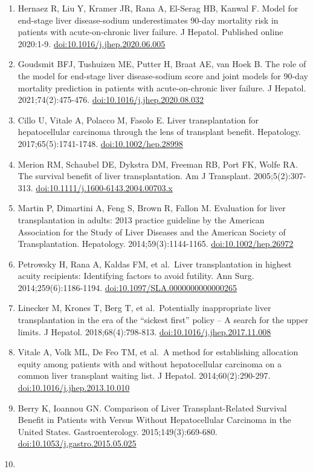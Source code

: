 \documentclass[11pt,english,]{book} %
\begin{document}
\begin{enumerate}
\item
  Hernaez R, Liu Y, Kramer JR, Rana A, El-Serag HB, Kanwal F. Model for end-stage liver disease-sodium underestimates 90-day mortality risk in patients with acute-on-chronic liver failure. J Hepatol. Published online 2020:1-9. \url{doi:10.1016/j.jhep.2020.06.005}
\item
  Goudsmit BFJ, Tushuizen ME, Putter H, Braat AE, van Hoek B. The role of the model for end-stage liver disease-sodium score and joint models for 90-day mortality prediction in patients with acute-on-chronic liver failure. J Hepatol. 2021;74(2):475-476. \url{doi:10.1016/j.jhep.2020.08.032}
\item
  Cillo U, Vitale A, Polacco M, Fasolo E. Liver transplantation for hepatocellular carcinoma through the lens of transplant benefit. Hepatology. 2017;65(5):1741-1748. \url{doi:10.1002/hep.28998}
\item
  Merion RM, Schaubel DE, Dykstra DM, Freeman RB, Port FK, Wolfe RA. The survival benefit of liver transplantation. Am J Transplant. 2005;5(2):307-313. \url{doi:10.1111/j.1600-6143.2004.00703.x}
\item
  Martin P, Dimartini A, Feng S, Brown R, Fallon M. Evaluation for liver transplantation in adults: 2013 practice guideline by the American Association for the Study of Liver Diseases and the American Society of Transplantation. Hepatology. 2014;59(3):1144-1165. \url{doi:10.1002/hep.26972}
\item
  Petrowsky H, Rana A, Kaldas FM, et al.~Liver transplantation in highest acuity recipients: Identifying factors to avoid futility. Ann Surg. 2014;259(6):1186-1194. \url{doi:10.1097/SLA.0000000000000265}
\item
  Linecker M, Krones T, Berg T, et al.~Potentially inappropriate liver transplantation in the era of the ``sickest first'' policy -- A search for the upper limits. J Hepatol. 2018;68(4):798-813. \url{doi:10.1016/j.jhep.2017.11.008}
\item
  Vitale A, Volk ML, De Feo TM, et al.~A method for establishing allocation equity among patients with and without hepatocellular carcinoma on a common liver transplant waiting list. J Hepatol. 2014;60(2):290-297. \url{doi:10.1016/j.jhep.2013.10.010}
\item
  Berry K, Ioannou GN. Comparison of Liver Transplant-Related Survival Benefit in Patients with Versus Without Hepatocellular Carcinoma in the United States. Gastroenterology. 2015;149(3):669-680. \url{doi:10.1053/j.gastro.2015.05.025}
\item

\end{enumerate}
\end{document}
